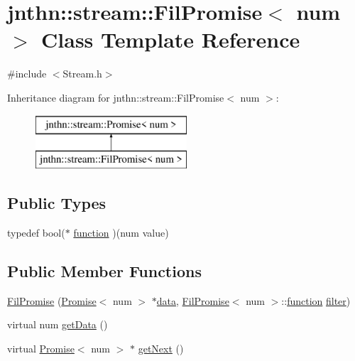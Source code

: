 \hypertarget{classjnthn_1_1stream_1_1FilPromise}{\section{jnthn\-:\-:stream\-:\-:Fil\-Promise$<$ num $>$ Class Template Reference}
\label{classjnthn_1_1stream_1_1FilPromise}
}


{\ttfamily \#include $<$Stream.\-h$>$}

Inheritance diagram for jnthn\-:\-:stream\-:\-:Fil\-Promise$<$ num $>$\-:\begin{figure}[H]
\begin{center}
\leavevmode
\includegraphics[height=2.000000cm]{classjnthn_1_1stream_1_1FilPromise}
\end{center}
\end{figure}
\subsection*{Public Types}
\begin{DoxyCompactItemize}
\item 
typedef bool($\ast$ \hyperlink{classjnthn_1_1stream_1_1FilPromise_a913328bcd089ed78816ed7b9a48f451c}{function} )(num value)
\end{DoxyCompactItemize}
\subsection*{Public Member Functions}
\begin{DoxyCompactItemize}
\item 
\hyperlink{classjnthn_1_1stream_1_1FilPromise_ab3e35d4eda1d20693de6705288b4d8a0}{Fil\-Promise} (\hyperlink{classjnthn_1_1stream_1_1Promise}{Promise}$<$ num $>$ $\ast$\hyperlink{classjnthn_1_1stream_1_1FilPromise_a96afb6c0553a74adf34c1fc2985e7c7e}{data}, \hyperlink{classjnthn_1_1stream_1_1FilPromise}{Fil\-Promise}$<$ num $>$\-::\hyperlink{classjnthn_1_1stream_1_1FilPromise_a913328bcd089ed78816ed7b9a48f451c}{function} \hyperlink{classjnthn_1_1stream_1_1FilPromise_abc2f868bf42fad27cda77e62d2b76cc7}{filter})
\item 
virtual num \hyperlink{classjnthn_1_1stream_1_1FilPromise_aa71b7543a7d2a080ba9e731f282d4c75}{get\-Data} ()
\item 
virtual \hyperlink{classjnthn_1_1stream_1_1Promise}{Promise}$<$ num $>$ $\ast$ \hyperlink{classjnthn_1_1stream_1_1FilPromise_a2cdd5bfff7be499272eedd5103890580}{get\-Next} ()
\end{DoxyCompactItemize}
